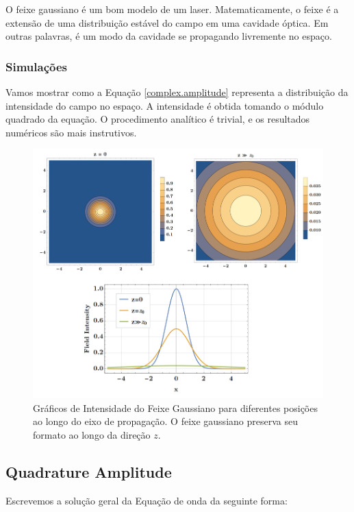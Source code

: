 \documentclass[12pt,a4paper]{report}
\begin{document}
O feixe gaussiano é um bom modelo de um laser. Matematicamente, o feixe é a extensão de uma distribuição estável do campo em uma cavidade óptica. Em outras palavras, é um modo da cavidade se propagando livremente no espaço.

\subsubsection{Simulações}

Vamos mostrar como a Equação \ref{complex.amplitude} representa a distribuição da intensidade do campo no espaço. A intensidade é obtida tomando o módulo quadrado da equação. O procedimento analítico é trivial, e os resultados numéricos são mais instrutivos.

\begin{figure}[H]
    \centering
    \includegraphics[width=1\linewidth]{gaussian beam.png}
    \caption{Gráficos de Intensidade do Feixe Gaussiano para diferentes posições ao longo do eixo de propagação. O feixe gaussiano preserva seu formato ao longo da direção $z$.}
    \label{slab.waveguide}
\end{figure}

\subsection{Quadrature Amplitude}\label{quatradure.amplitude}

Escrevemos a solução geral da Equação de onda da seguinte forma:
\end{document}
